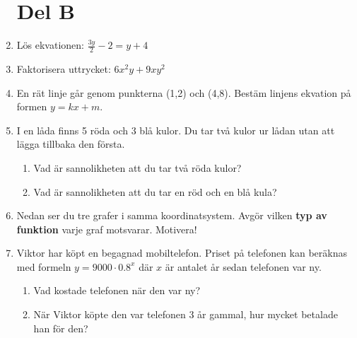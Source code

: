 \documentclass[a4paper,11pt]{article}
\begin{document}
\begin{enumerate}[label=\textbf{\arabic*.}]
\section*{Del B}
    \item Lös ekvationen: $\frac{3y}{2} -2 = y + 4$
    \item Faktorisera uttrycket: $6x^2y + 9xy^2$
    \item En rät linje går genom punkterna (1,2) och (4,8). Bestäm linjens ekvation på formen $y = kx + m$.
    \item I en låda finns 5 röda och 3 blå kulor. Du tar två kulor ur lådan utan att lägga tillbaka den första.
    \begin{enumerate}[label=\alph*)]
      \item Vad är sannolikheten att du tar två röda kulor?
      \item Vad är sannolikheten att du tar en röd och en blå kula?
    \end{enumerate}
    \item Nedan ser du tre grafer i samma koordinatsystem. Avgör vilken \textbf{typ av funktion} varje graf motsvarar. Motivera!
    \begin{center}
    \end{center}
    \item Viktor har köpt en begagnad mobiltelefon. Priset på telefonen kan beräknas med formeln $y=9000 \cdot 0.8^x$ där $x$ är antalet år sedan telefonen var ny.
    \begin{enumerate}[label=\alph*)]
      \item Vad kostade telefonen när den var ny?
      \item När Viktor köpte den var telefonen 3 år gammal, hur mycket betalade han för den?

\end{enumerate}
\end{enumerate}
\end{document}
